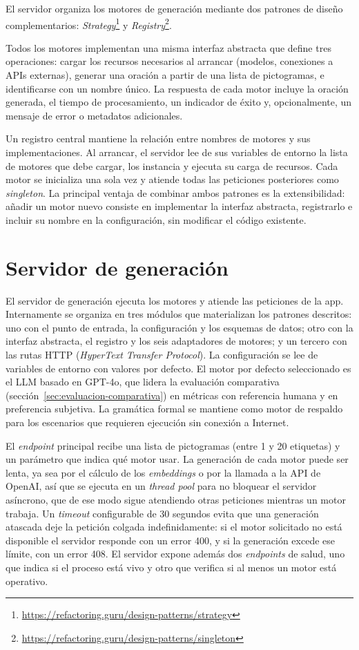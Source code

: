 El servidor organiza los motores de generación mediante dos patrones de diseño complementarios: \textit{Strategy}\footnote{\url{https://refactoring.guru/design-patterns/strategy}} y \textit{Registry}\footnote{\url{https://refactoring.guru/design-patterns/singleton}}.

Todos los motores implementan una misma interfaz abstracta que define tres operaciones: cargar los recursos necesarios al arrancar (modelos, conexiones a APIs externas), generar una oración a partir de una lista de pictogramas, e identificarse con un nombre único. La respuesta de cada motor incluye la oración generada, el tiempo de procesamiento, un indicador de éxito y, opcionalmente, un mensaje de error o metadatos adicionales.

Un registro central mantiene la relación entre nombres de motores y sus implementaciones. Al arrancar, el servidor lee de sus variables de entorno la lista de motores que debe cargar, los instancia y ejecuta su carga de recursos. Cada motor se inicializa una sola vez y atiende todas las peticiones posteriores como \textit{singleton}. La principal ventaja de combinar ambos patrones es la extensibilidad: añadir un motor nuevo consiste en implementar la interfaz abstracta, registrarlo e incluir su nombre en la configuración, sin modificar el código existente.

\section{Servidor de generación}
\label{sec:app-servidor}

El servidor de generación ejecuta los motores y atiende las peticiones de la app. Internamente se organiza en tres módulos que materializan los patrones descritos: uno con el punto de entrada, la configuración y los esquemas de datos; otro con la interfaz abstracta, el registro y los seis adaptadores de motores; y un tercero con las rutas HTTP (\textit{HyperText Transfer Protocol}). La configuración se lee de variables de entorno con valores por defecto. El motor por defecto seleccionado es el LLM basado en GPT-4o, que lidera la evaluación comparativa (sección~\ref{sec:evaluacion-comparativa}) en métricas con referencia humana y en preferencia subjetiva. La gramática formal se mantiene como motor de respaldo para los escenarios que requieren ejecución sin conexión a Internet.

El \textit{endpoint} principal recibe una lista de pictogramas (entre 1 y 20 etiquetas) y un parámetro que indica qué motor usar. La generación de cada motor puede ser lenta, ya sea por el cálculo de los \textit{embeddings} o por la llamada a la API de OpenAI, así que se ejecuta en un \textit{thread pool} para no bloquear el servidor asíncrono, que de ese modo sigue atendiendo otras peticiones mientras un motor trabaja. Un \textit{timeout} configurable de 30 segundos evita que una generación atascada deje la petición colgada indefinidamente: si el motor solicitado no está disponible el servidor responde con un error 400, y si la generación excede ese límite, con un error 408. El servidor expone además dos \textit{endpoints} de salud, uno que indica si el proceso está vivo y otro que verifica si al menos un motor está operativo.

